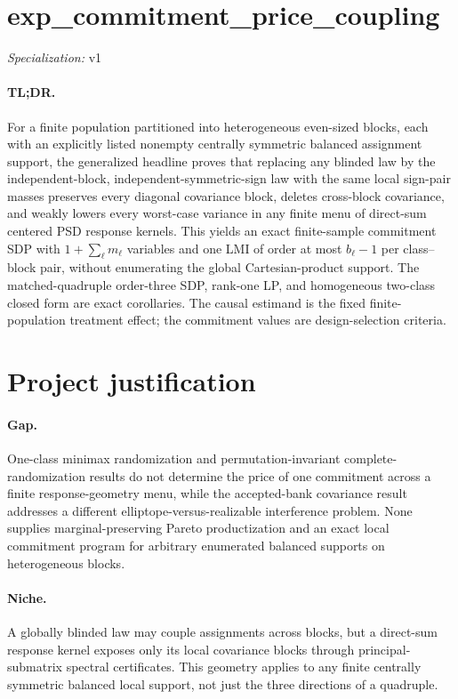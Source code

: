 \documentclass{article}
\begin{document}
\sloppy

\section*{exp\_\allowbreak{}commitment\_\allowbreak{}price\_\allowbreak{}coupling}

\noindent\textit{Specialization:} v1\par

\paragraph{TL;DR.} For a finite population partitioned into heterogeneous even-sized blocks, each with an explicitly listed nonempty centrally symmetric balanced assignment support, the generalized headline proves that replacing any blinded law by the independent-block, independent-symmetric-sign law with the same local sign-pair masses preserves every diagonal covariance block, deletes cross-block covariance, and weakly lowers every worst-case variance in any finite menu of direct-sum centered PSD response kernels. This yields an exact finite-sample commitment SDP with \(1+\sum_\ell m_\ell\) variables and one LMI of order at most \(b_\ell-1\) per class--block pair, without enumerating the global Cartesian-product support. The matched-quadruple order-three SDP, rank-one LP, and homogeneous two-class closed form are exact corollaries. The causal estimand is the fixed finite-population treatment effect; the commitment values are design-selection criteria.

\section{Project justification}

\paragraph{Gap.} One-class minimax randomization and permutation-invariant complete-randomization results do not determine the price of one commitment across a finite response-geometry menu, while the accepted-bank covariance result addresses a different elliptope-versus-realizable interference problem. None supplies marginal-preserving Pareto productization and an exact local commitment program for arbitrary enumerated balanced supports on heterogeneous blocks.

\paragraph{Niche.} A globally blinded law may couple assignments across blocks, but a direct-sum response kernel exposes only its local covariance blocks through principal-submatrix spectral certificates. This geometry applies to any finite centrally symmetric balanced local support, not just the three directions of a quadruple.
\end{document}
